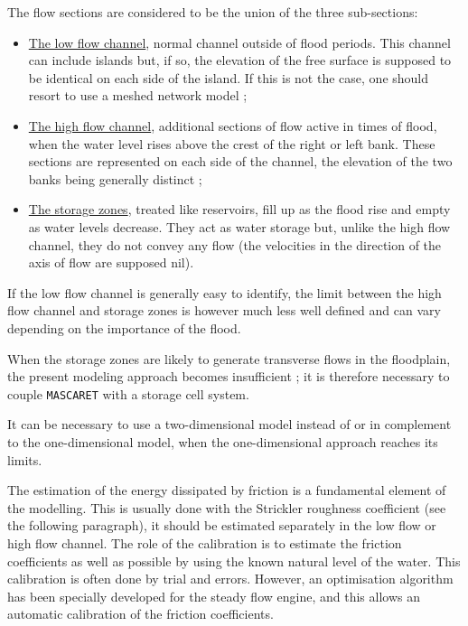 The flow sections are considered to be the union of the three sub-sections:
\begin{itemize}
 \item \underline{The low flow channel}, normal channel outside of flood periods. This channel can include islands but, if so, the elevation of the free surface is supposed to be identical on each side of the island. If this is not the case, one should resort to use a meshed network model ;
 \item \underline{The high flow channel}, additional sections of flow active in times of flood, when the water level rises above the crest of the right or left bank. These sections are represented on each side of the channel, the elevation of the two banks being generally distinct ;
 \item \underline{The storage zones}, treated like reservoirs, fill up as the flood rise and empty as water levels decrease. They act as water storage but, unlike the high flow channel, they do not convey any flow (the velocities in the direction of the axis of flow are supposed nil).
\end{itemize}

\vspace{0.5cm}

If the low flow channel is generally easy to identify, the limit between the high flow channel and storage zones is however much less well defined and can vary depending on the importance of the flood.

\vspace{0.5cm}

When the storage zones are likely to generate transverse flows in the floodplain, the present modeling approach becomes insufficient ; it is therefore necessary to couple \texttt{MASCARET} with a storage cell system.

\vspace{0.5cm}

It can be necessary to use a two-dimensional model instead of or in complement to the one-dimensional model, when the one-dimensional approach reaches its limits.

\vspace{0.5cm}

The estimation of the energy dissipated by friction is a fundamental element of the modelling. This is usually done with the Strickler roughness coefficient (see the following paragraph), it should be estimated separately in the low flow or high flow channel. The role of the calibration is to estimate the friction coefficients as well as possible by using the known natural level of the water. This calibration is often done by trial and errors. However, an optimisation algorithm has been specially developed for the steady flow engine, and this allows an automatic calibration of the friction coefficients. 

